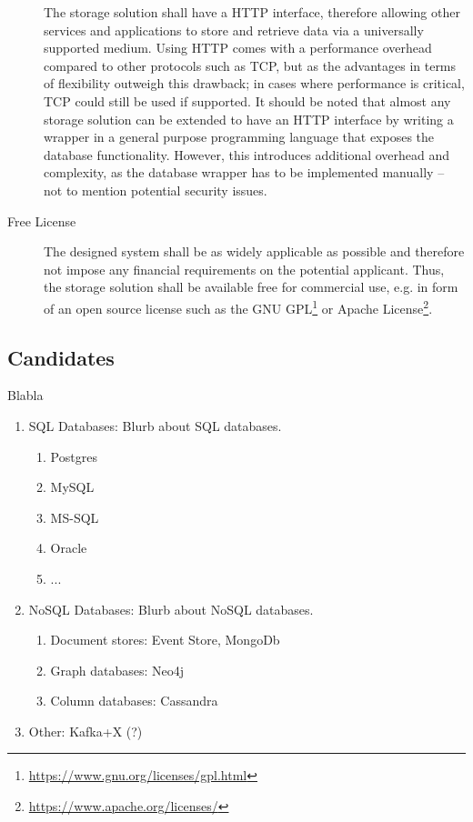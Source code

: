 \begin{description}
The storage solution shall have a HTTP interface, therefore allowing other services and applications to store and retrieve data via a universally supported medium.
Using HTTP comes with a performance overhead compared to other protocols such as TCP, but as  the advantages in terms of flexibility outweigh this drawback; in cases where performance is critical, TCP could still be used if supported.
It should be noted that almost any storage solution can be extended to have an HTTP interface by writing a wrapper in a general purpose programming language that exposes the database functionality.
However, this introduces additional overhead and complexity, as the database wrapper has to be implemented manually -- not to mention potential security issues.
\item [Free License]
The designed system shall be as widely applicable as possible and therefore not impose any financial requirements on the potential applicant.
Thus, the storage solution shall be available free for commercial use, e.g. in form of an open source license such as the GNU GPL\footnote{\url{https://www.gnu.org/licenses/gpl.html}} or Apache License\footnote{\url{https://www.apache.org/licenses/}}.
\end{description}


\subsection{Candidates}

Blabla

\begin{enumerate}
\item \ac{SQL} Databases: Blurb about SQL databases.
\begin{enumerate}
\item Postgres
\item MySQL
\item MS-SQL
\item Oracle
\item ...
\end{enumerate}
\item NoSQL Databases: Blurb about NoSQL databases.\cite{strauch2011nosql}
\begin{enumerate}
\item Document stores: Event Store, MongoDb
\item Graph databases: Neo4j
\item Column databases: Cassandra
\end{enumerate}
\item Other: Kafka+X (?)
\end{enumerate}

